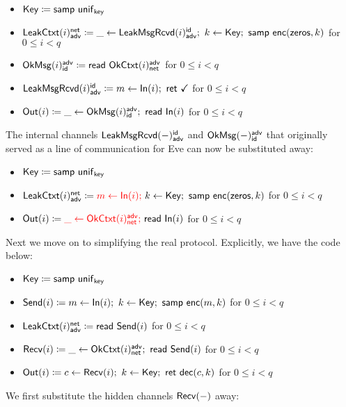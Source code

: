 \begin{itemize}
\item $\mathsf{Key} \coloneqq \mathsf{samp} \ \mathsf{unif}_{\mathsf{key}}$
\item $\LeakCtxt(i)^\net_\adv \coloneqq \_ \leftarrow \LeakMsgRcvd(i)^\id_\adv; \ k \leftarrow \Key; \ \samp{\enc(\zeros,k)}$ for $0 \leq i < q$
\item $\mathsf{OkMsg}(i)^{\mathsf{adv}}_{\mathsf{id}} \coloneqq \mathsf{read} \ \mathsf{OkCtxt}(i)^{\mathsf{adv}}_{\mathsf{net}}$ for $0 \leq i < q$
\item $\mathsf{LeakMsgRcvd}(i)^{\mathsf{id}}_{\mathsf{adv}} \coloneqq m \leftarrow \mathsf{In}(i); \ \mathsf{ret} \ \checkmark$ for $0 \leq i < q$
\item $\mathsf{Out}(i) \coloneqq \_ \leftarrow \mathsf{OkMsg}(i)^{\mathsf{adv}}_{\mathsf{id}}; \ \mathsf{read} \ \mathsf{In}(i)$ for $0 \leq i < q$
\end{itemize}

\noindent The internal channels $\mathsf{LeakMsgRcvd}(-)^{\mathsf{id}}_{\mathsf{adv}}$ and $\mathsf{OkMsg}(-)^{\mathsf{adv}}_{\mathsf{id}}$ that originally served as a line of communication for Eve can now be substituted away:

\begin{itemize}
\item $\mathsf{Key} \coloneqq \mathsf{samp} \ \mathsf{unif}_{\mathsf{key}}$
\item $\LeakCtxt(i)^\net_\adv \coloneqq {\color{red} m \leftarrow \In(i);} \ k \leftarrow \Key; \ \samp{\enc(\zeros,k)}$ for $0 \leq i < q$
\item $\mathsf{Out}(i) \coloneqq {\color{red} \_ \leftarrow \mathsf{OkCtxt}(i)^{\mathsf{adv}}_{\mathsf{net}};} \ \mathsf{read} \ \mathsf{In}(i)$ for $0 \leq i < q$
\end{itemize}

\noindent Next we move on to simplifying the real protocol.  Explicitly, we have the code below:

\begin{itemize}
\item $\mathsf{Key} \coloneqq \mathsf{samp} \ \mathsf{unif}_{\mathsf{key}}$
\item $\mathsf{Send}(i) \coloneqq m \leftarrow \mathsf{In}(i); \ k \leftarrow \mathsf{Key}; \ \mathsf{samp} \ \mathsf{enc}(m,k)$ for $0 \leq i < q$
\item $\mathsf{LeakCtxt}(i)^{\mathsf{net}}_{\mathsf{adv}} \coloneqq \mathsf{read} \ \mathsf{Send}(i)$ for $0 \leq i < q$
\item $\mathsf{Recv}(i) \coloneqq \_ \leftarrow \mathsf{OkCtxt}(i)^{\mathsf{adv}}_{\mathsf{net}}; \ \mathsf{read} \ \mathsf{Send}(i)$ for $0 \leq i < q$
\item $\mathsf{Out}(i) \coloneqq c \leftarrow \mathsf{Recv}(i); \ k \leftarrow \mathsf{Key}; \ \mathsf{ret} \ \mathsf{dec}(c,k)$ for $0 \leq i < q$
\end{itemize}

\noindent We first substitute the hidden channels $\mathsf{Recv}(-)$ away:

